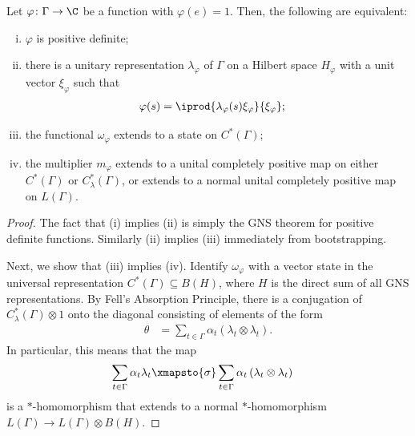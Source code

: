 \documentclass[10pt]{mypackage}
\begin{document}
\begin{theorem}
  Let $\varphi\colon \Gamma\to \C$ be a function with $\varphi(e) = 1$. Then, the following are equivalent:
  \begin{enumerate}[(i)]
    \item $\varphi$ is positive definite;
    \item there is a unitary representation $\lambda_{\varphi}$ of $\Gamma$ on a Hilbert space $H_{\varphi}$ with a unit vector $\xi_{\varphi}$ such that
      \begin{align*}
        \varphi(s) &= \iprod{\lambda_{\varphi}(s)\xi_{\varphi}}{\xi_{\varphi}};
      \end{align*}
    \item the functional $\omega_{\varphi}$ extends to a state on $C^{\ast}\left( \Gamma \right)$;
    \item the multiplier $m_{\varphi}$ extends to a unital completely positive map on either $C^{\ast}\left( \Gamma \right)$ or $C^{\ast}_{\lambda}\left( \Gamma \right)$, or extends to a normal unital completely positive map on $L\left( \Gamma \right)$.
  \end{enumerate}
\end{theorem}
\begin{proof}
  The fact that (i) implies (ii) is simply the GNS theorem for positive definite functions. Similarly (ii) implies (iii) immediately from bootstrapping.

  Next, we show that (iii) implies (iv). Identify $\omega_{\varphi}$ with a vector state in the universal representation $C^{\ast}\left( \Gamma \right)\subseteq B\left( H \right)$, where $H$ is the direct sum of all GNS representations. By Fell's Absorption Principle, there is a conjugation of $C^{\ast}_{\lambda}\left( \Gamma \right)\otimes 1$ onto the diagonal consisting of elements of the form
  \begin{align*}
    \theta &= \sum_{t\in \Gamma} \alpha_t \left( \lambda_t\otimes \lambda_t \right).
  \end{align*}
  In particular, this means that the map
  \begin{align*}
    \sum_{t\in \Gamma} \alpha_t\lambda_t &\xmapsto{\sigma} \sum_{t\in \Gamma}\alpha_t\left( \lambda_t\otimes \lambda_t \right)
  \end{align*}
  is a $\ast$-homomorphism that extends to a normal $\ast$-homomorphism $L\left( \Gamma \right)\to L\left( \Gamma \right)\otimes B\left( H \right)$.
\end{proof}
\end{document}
